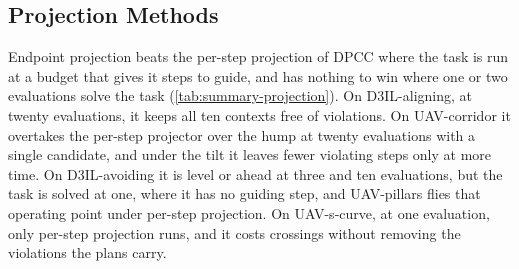\subsection{Projection Methods}\label{sec:res:constraints}

Endpoint projection beats the per-step projection of \ac{DPCC} where the task is run at a budget that gives
it steps to guide, and has nothing to win where one or two evaluations solve the task
(\autoref{tab:summary-projection}). On D3IL-aligning, at twenty evaluations, it keeps all ten contexts free
of violations. On UAV-corridor it overtakes the per-step projector over the hump at twenty evaluations with a
single candidate, and under the tilt it leaves fewer violating steps only at more time. On D3IL-avoiding it
is level or ahead at three and ten evaluations, but the task is solved at one, where it has no guiding step,
and UAV-pillars flies that operating point under per-step projection. On UAV-s-curve, at one evaluation, only
per-step projection runs, and it costs crossings without removing the violations the plans carry.

